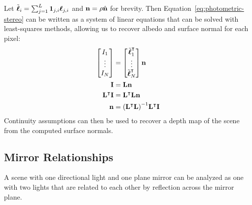 Let $\tilde{\boldsymbol{\ell}}_i = \sum_{j = 1}^L \mathbf{1}_{j, i} \boldsymbol{\ell}_{j, i}$ and
$\mathbf{n} = \rho \hat{\mathbf{n}}$ for brevity. Then
Equation~\ref{eq:photometric-stereo} can be written as a system of linear
equations that can be solved with least-squares methods, allowing us to recover
albedo and surface normal for each pixel:
\begin{align}
  \begin{bmatrix}
    I_1 \\
    \vdots \\
    I_N
  \end{bmatrix}             &= \begin{bmatrix}
    \tilde{\boldsymbol{\ell}}_1^\intercal \\
    \vdots \\
    \tilde{\boldsymbol{\ell}}_N^\intercal
  \end{bmatrix} \mathbf{n} \\
  \mathbf{I}                   &= \mathbf{L} \mathbf{n} \\
  \mathbf{L}^\intercal \mathbf{I} &= \mathbf{L}^\intercal \mathbf{L} \mathbf{n} \\
  \mathbf{n}                    &= {\left(\mathbf{L}^\intercal \mathbf{L}\right)}^{-1} \mathbf{L}^\intercal \mathbf{I} \label{eq:pseudoinverse}
\end{align}
Continuity assumptions can then be used to recover a depth map of the scene
from the computed surface normals.
\subsection{Mirror Relationships}
A scene with one directional light and one plane mirror can be analyzed as one
with two lights that are related to each other by reflection across the mirror
plane.


